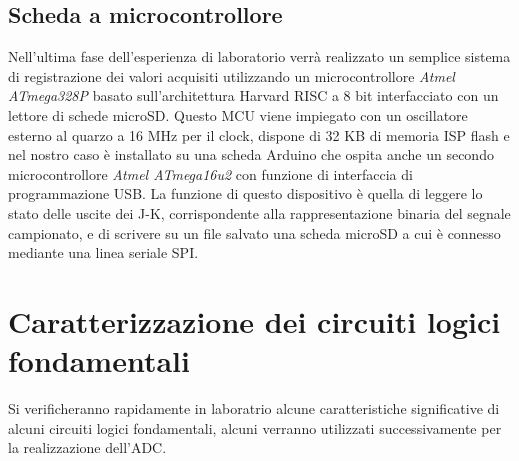 \documentclass[journal]{IEEEtran}
\begin{document}
\subsection{Scheda a microcontrollore}
Nell'ultima fase dell'esperienza di laboratorio verrà realizzato un semplice sistema di registrazione dei valori acquisiti utilizzando un microcontrollore \textit{Atmel ATmega328P} basato sull'architettura Harvard RISC a 8 bit interfacciato con un lettore di schede microSD. Questo MCU viene impiegato con un oscillatore esterno al quarzo a 16 MHz per il clock, dispone di 32 KB di memoria ISP flash e nel nostro caso è installato su una scheda Arduino che ospita anche un secondo microcontrollore \textit{Atmel ATmega16u2} con funzione di interfaccia di programmazione USB. La funzione di questo dispositivo è quella di leggere lo stato delle uscite dei J-K, corrispondente alla rappresentazione binaria del segnale campionato, e di scrivere su un file salvato una scheda microSD a cui è connesso mediante una linea seriale SPI.


\section{Caratterizzazione dei circuiti logici fondamentali}
Si verificheranno rapidamente in laboratrio alcune caratteristiche significative di alcuni circuiti logici fondamentali, alcuni verranno utilizzati successivamente per la realizzazione dell'ADC.
\end{document}
